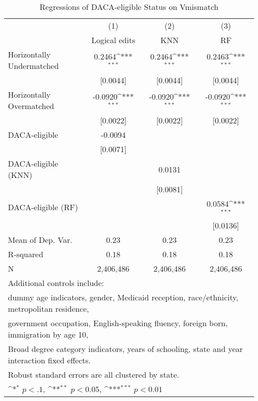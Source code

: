 \begin{table}[htbp]\centering
\def\sym#1{\ifmmode^{#1}\else\(^{#1}\)\fi}
\caption{Regressions of DACA-eligible Status on Vmismatch}
\begin{tabular}{l*{3}{c}}
\toprule
                    &\multicolumn{1}{c}{(1)}         &\multicolumn{1}{c}{(2)}         &\multicolumn{1}{c}{(3)}         \\
                    &Logical edits         &         KNN         &          RF         \\
\midrule
Horizontally Undermatched&      0.2464\sym{***}&      0.2464\sym{***}&      0.2463\sym{***}\\
                    &    [0.0044]         &    [0.0044]         &    [0.0044]         \\
\addlinespace
Horizontally Overmatched&     -0.0920\sym{***}&     -0.0920\sym{***}&     -0.0920\sym{***}\\
                    &    [0.0022]         &    [0.0022]         &    [0.0022]         \\
\addlinespace
DACA-eligible       &     -0.0094         &                     &                     \\
                    &    [0.0071]         &                     &                     \\
\addlinespace
DACA-eligible (KNN) &                     &      0.0131         &                     \\
                    &                     &    [0.0081]         &                     \\
\addlinespace
DACA-eligible (RF)  &                     &                     &      0.0584\sym{***}\\
                    &                     &                     &    [0.0136]         \\
\midrule
Mean of Dep. Var.   &        0.23         &        0.23         &        0.23         \\
R-squared           &        0.18         &        0.18         &        0.18         \\
N                   &   2,406,486         &   2,406,486         &   2,406,486         \\
\bottomrule
\multicolumn{4}{l}{\footnotesize Additional controls include:}\\
\multicolumn{4}{l}{\footnotesize dummy age indicators, gender, Medicaid reception, race/ethnicity, metropolitan residence,}\\
\multicolumn{4}{l}{\footnotesize government occupation, English-speaking fluency, foreign born, immigration by age 10,}\\
\multicolumn{4}{l}{\footnotesize Broad degree category indicators, years of schooling, state and year interaction fixed effects.}\\
\multicolumn{4}{l}{\footnotesize Robust standard errors are all clustered by state.}\\
\multicolumn{4}{l}{\footnotesize \sym{*} \(p<.1\), \sym{**} \(p<0.05\), \sym{***} \(p<0.01\)}\\
\end{tabular}
\end{table}
